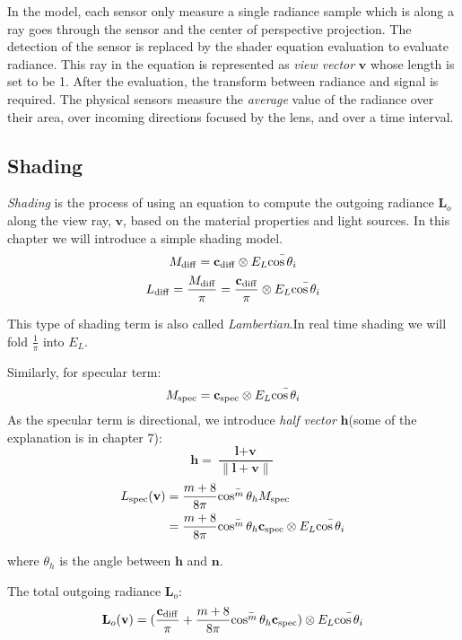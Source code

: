 \documentclass[10pt, a4paper]{article}
\begin{document}
        In the model, each sensor only measure a single radiance sample which is along a ray goes through the sensor and the center of perspective projection. The detection of the sensor is replaced by the shader equation evaluation to evaluate radiance. This ray in the equation is represented as \emph{view vector} $\textbf{v}$ whose length is set to be 1. After the evaluation, the transform between radiance and signal is required. The physical sensors measure the \emph{average} value of the radiance over their area, over incoming directions focused by the lens, and over a time interval. 
    
    \subsection{Shading}
        \emph{Shading} is the process of using an equation to compute the outgoing radiance $\textbf{L}_o$ along the view ray, $\textbf{v}$, based on the material properties and light sources. In this chapter we will introduce a simple shading model. 
            $$M_{\rm{diff}} = \textbf{c}_{\rm{diff}} \otimes E_L\bar{\cos{\theta_i}}$$
            $$L_{\rm{diff}} = \frac{M_{\rm{diff}}}{\pi} = \frac{\textbf{c}_{\rm{diff}}}{\pi} \otimes E_L\bar{\cos{\theta_i}}$$
        
        This type of shading term is also called \emph{Lambertian}.In real time shading we will fold $\frac{1}{\pi}$ into $E_L$. 

        Similarly, for specular term: 
            $$M_{\rm{spec}} = \textbf{c}_{\rm{spec}} \otimes E_{L}\bar{\cos{\theta_i}}$$
        As the specular term is directional, we introduce \emph{half vector} $\textbf{h}$(some of the explanation is in chapter 7):
            $$\textbf{h} = \frac{\textbf{l} + \textbf{v}}{\parallel \textbf{l} + \textbf{v} \parallel}$$
            \begin{align*} L_{\rm{spec}}(\textbf{v}) &= \frac{m + 8}{8\pi}\bar{\cos^m{\theta_h}}M_{\rm{spec}}\\
             &= \frac{m + 8}{8\pi}\bar{\cos^m{\theta_h}}\textbf{c}_{\rm{spec}} \otimes E_{L}\bar{\cos{\theta_i}}
            \end{align*}
        
        where $\theta_h$ is the angle between $\textbf{h}$ and $\textbf{n}$.
        
        The total outgoing radiance $\textbf{L}_o$:
        $$\textbf{L}_o(\textbf{v}) = (\frac{\textbf{c}_{\rm{diff}}}{\pi} + \frac{m + 8}{8\pi}\bar{\cos^m{\theta_h}}\textbf{c}_{\rm{spec}}) \otimes E_L\bar{\cos{\theta_i}}$$
        
\end{document}

